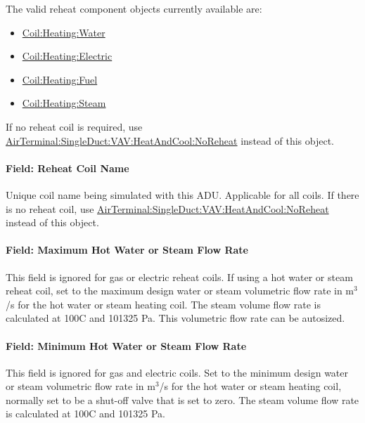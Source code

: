 The valid reheat component objects currently available are:

\begin{itemize}
\item
  \hyperref[coilheatingwater]{Coil:Heating:Water}
\item
  \hyperref[coilheatingelectric]{Coil:Heating:Electric}
\item
  \hyperref[coilheatinggas-000]{Coil:Heating:Fuel}
\item
  \hyperref[coilheatingsteam]{Coil:Heating:Steam}
\end{itemize}

If no reheat coil is required, use \hyperref[airterminalsingleductvavheatandcoolnoreheat]{AirTerminal:SingleDuct:VAV:HeatAndCool:NoReheat} instead of this object.

\paragraph{Field: Reheat Coil Name}\label{field-reheat-coil-name-2}

Unique coil name being simulated with this ADU. Applicable for all coils. If there is no reheat coil, use \hyperref[airterminalsingleductvavheatandcoolnoreheat]{AirTerminal:SingleDuct:VAV:HeatAndCool:NoReheat} instead of this object.

\paragraph{Field: Maximum Hot Water or Steam Flow Rate}\label{field-maximum-hot-water-or-steam-flow-rate-3}

This field is ignored for gas or electric reheat coils. If using a hot water or steam reheat coil, set to the maximum design water or steam volumetric flow rate in m\(^{3}\)/s for the hot water or steam heating coil. The steam volume flow rate is calculated at 100C and 101325 Pa. This volumetric flow rate can be autosized.

\paragraph{Field: Minimum Hot Water or Steam Flow Rate}\label{field-minimum-hot-water-or-steam-flow-rate-3}

This field is ignored for gas and electric coils. Set to the minimum design water or steam volumetric flow rate in m\(^{3}\)/s for the hot water or steam heating coil, normally set to be a shut-off valve that is set to zero. The steam volume flow rate is calculated at 100C and 101325 Pa.

